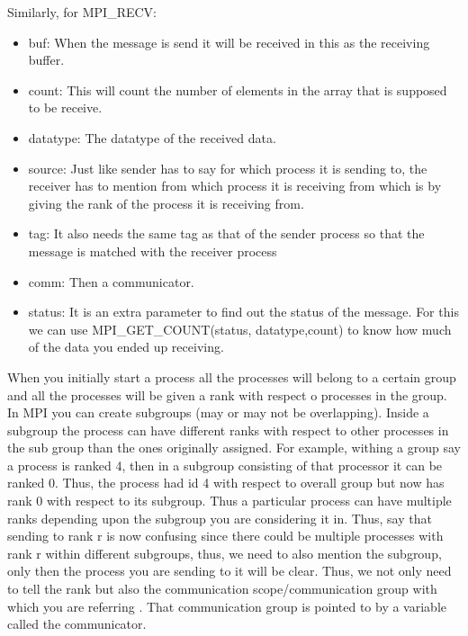 \documentclass[12pt]{article}
\begin{document}
Similarly, for MPI\_RECV:
\begin{itemize}
    \item buf: When the message is send it will be received in this as the receiving buffer.
    \item count: This will count the number of elements in the array that is supposed to be receive.
    \item datatype: The datatype of the received data.
    \item source: Just like sender has to say for which process it is sending to, the receiver has to mention from which process it is receiving from which is by giving the rank of the process it is receiving from.
    \item tag: It also needs the same tag as that of the sender process so that the message is matched with the receiver process
    \item comm: Then a communicator.
    \item status: It is an extra parameter to find out the status of the message. For this we can use MPI\_GET\_COUNT(status, datatype,count) to know how much of the data you ended up receiving.
\end{itemize}

When you initially start a process all the processes will belong to a certain group and all the processes will be given a rank with respect o processes in the group. In MPI you can create subgroups (may or may not be overlapping). Inside a subgroup the process can have different ranks with respect to other processes in the sub group than the ones originally assigned. For example, withing a group say a process is ranked 4, then in a subgroup consisting of that processor it can be ranked 0. Thus, the process had id 4 with respect to overall group but now has rank 0 with respect to its subgroup. Thus a particular process can have multiple ranks depending upon the subgroup you are considering it in. Thus, say that sending to rank r is now confusing since there could be multiple processes with rank r within different subgroups, thus, we need to also mention the subgroup, only then the process you are sending to it will be clear.  Thus, we not only need to tell the rank but also the communication scope/communication group with which you are referring . That communication group is pointed to by a variable called the communicator.
\end{document}
